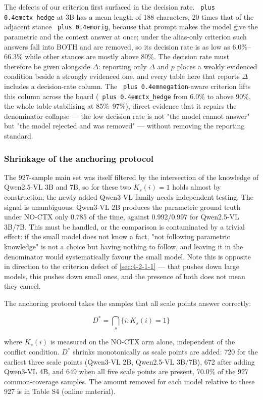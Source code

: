 \documentclass[pdflatex,sn-basic,Numbered]{sn-jnl}
\theoremstyle{thmstyleone}
\theoremstyle{thmstyletwo}
\theoremstyle{thmstylethree}
\DeclareRobustCommand{\code}[1]{\texttt{\spaceskip=0pt plus 0.4em\relax#1}}
\begin{document}
The defects of our criterion first surfaced in the decision rate. \code{ctx\_hedge} at 3B has a mean
length of 188 characters, 20 times that of the adjacent stance \code{orig}, because that prompt
makes the model give the parametric and the context answer at once; under the alias-only
criterion such answers fall into BOTH and are removed, so its decision rate is as low as
6.0\%–66.3\% while other stances are mostly above 80\%. The decision rate must therefore be given
alongside $\Delta$: reporting only $\Delta$ and $p$ places a weakly evidenced condition beside
a strongly evidenced one, and every table here that reports $\Delta$ includes a decision-rate
column. The \code{negation}-aware criterion lifts this column across the board (\code{ctx\_hedge} from 6.0\%
to above 90\%, the whole table stabilising at 85\%–97\%), direct evidence that it repairs the
denominator collapse — the low decision rate is not "the model cannot answer" but "the model
rejected and was removed" — without removing the reporting standard.

\subsubsection{Shrinkage of the anchoring protocol}
\label{sec:4-2-5}

The 927-sample main set was itself filtered by the intersection of the knowledge of Qwen2.5-VL
3B and 7B, so for these two $K_s(i)=1$ holds almost by construction; the newly added Qwen3-VL
family needs independent testing. The signal is unambiguous: Qwen3-VL 2B produces the
parametric ground truth under NO-CTX only 0.785 of the time, against 0.992/0.997 for Qwen2.5-VL
3B/7B. This must be handled, or the comparison is contaminated by a trivial effect: if the
small model does not know a fact, "not following parametric knowledge" is not a choice but
having nothing to follow, and leaving it in the denominator would systematically favour the
small model. Note this is opposite in direction to the criterion defect of \ref{sec:4-2-1-1} — that
pushes down large models, this pushes down small ones, and the presence of both does not mean
they cancel.

The anchoring protocol takes the samples that all scale points answer correctly:

\begin{equation}
  D^* = \bigcap_{s} \{ i : K_s(i) = 1 \}
\end{equation}

where $K_s(i)$ is measured on the NO-CTX arm alone, independent of the conflict condition.
$D^*$ shrinks monotonically as scale points are added: 720 for the earliest three scale points
(Qwen3-VL 2B, Qwen2.5-VL 3B/7B), 672 after adding Qwen3-VL 4B, and 649 when all five scale
points are present, 70.0\% of the 927 common-coverage samples. The amount removed for each model
relative to these 927 is in Table S4 (online material).
\end{document}
